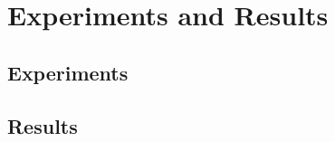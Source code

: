 


\chapter{Experiments and Results} %

\label{Chapter5} %


\section{Experiments}

\section{Results}